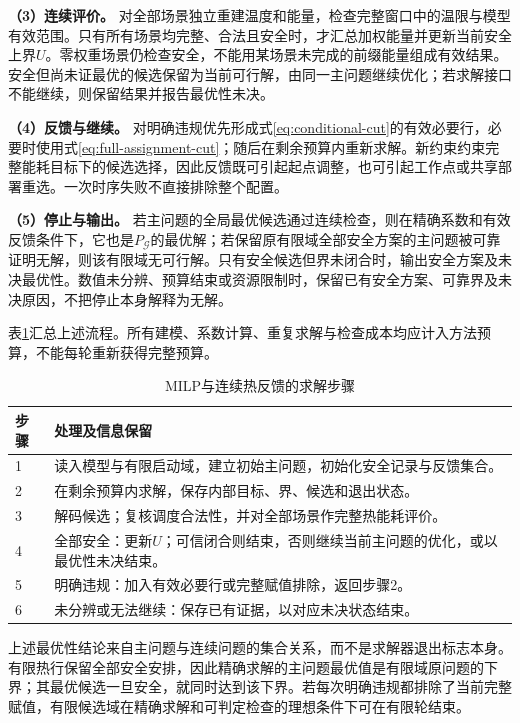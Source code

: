 \textbf{（3）连续评价。} 对全部场景独立重建温度和能量，检查完整窗口中的温限与模型有效范围。只有所有场景均完整、合法且安全时，才汇总加权能量并更新当前安全上界\(U\)。零权重场景仍检查安全，不能用某场景未完成的前缀能量组成有效结果。安全但尚未证最优的候选保留为当前可行解，由同一主问题继续优化；若求解接口不能继续，则保留结果并报告最优性未决。

\textbf{（4）反馈与继续。} 对明确违规优先形成式\eqref{eq:conditional-cut}的有效必要行，必要时使用式\eqref{eq:full-assignment-cut}；随后在剩余预算内重新求解。新约束约束完整能耗目标下的候选选择，因此反馈既可引起起点调整，也可引起工作点或共享部署重选。一次时序失败不直接排除整个配置。

\textbf{（5）停止与输出。} 若主问题的全局最优候选通过连续检查，则在精确系数和有效反馈条件下，它也是\(P_{\mathcal G}\)的最优解；若保留原有限域全部安全方案的主问题被可靠证明无解，则该有限域无可行解。只有安全候选但界未闭合时，输出安全方案及未决最优性。数值未分辨、预算结束或资源限制时，保留已有安全方案、可靠界及未决原因，不把停止本身解释为无解。

表\ref{tab:solver-outline}汇总上述流程。所有建模、系数计算、重复求解与检查成本均应计入方法预算，不能每轮重新获得完整预算。

\begin{table}[htbp]
\centering
\caption{MILP与连续热反馈的求解步骤}
\label{tab:solver-outline}
\begin{tabular}{p{}p{}}
\toprule
步骤 & 处理及信息保留 \\
\midrule
1 & 读入模型与有限启动域，建立初始主问题，初始化安全记录与反馈集合。\\
2 & 在剩余预算内求解，保存内部目标、界、候选和退出状态。\\
3 & 解码候选；复核调度合法性，并对全部场景作完整热能耗评价。\\
4 & 全部安全：更新\(U\)；可信闭合则结束，否则继续当前主问题的优化，或以最优性未决结束。\\
5 & 明确违规：加入有效必要行或完整赋值排除，返回步骤2。\\
6 & 未分辨或无法继续：保存已有证据，以对应未决状态结束。\\
\bottomrule
\end{tabular}
\end{table}

上述最优性结论来自主问题与连续问题的集合关系，而不是求解器退出标志本身。有限热行保留全部安全安排，因此精确求解的主问题最优值是有限域原问题的下界；其最优候选一旦安全，就同时达到该下界。若每次明确违规都排除了当前完整赋值，有限候选域在精确求解和可判定检查的理想条件下可在有限轮结束。

